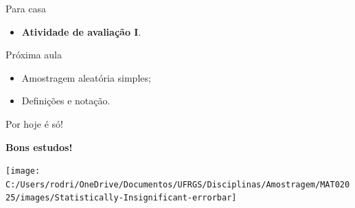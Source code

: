 \documentclass[
  10pt,
  ignorenonframetext,
]{beamer}
\providecommand{\tightlist}{%
  \setlength{\itemsep}{0pt}\setlength{\parskip}{0pt}}
\begin{document}
\begin{frame}{Para casa}
\protect\hypertarget{para-casa}{}
\begin{itemize}
\tightlist
\item
  \textbf{Atividade de avaliação I}.
\end{itemize}
\end{frame}

\begin{frame}{Próxima aula}
\protect\hypertarget{pruxf3xima-aula}{}
\begin{itemize}
\tightlist
\item
  Amostragem aleatória simples;
\item
  Definições e notação.
\end{itemize}
\end{frame}

\begin{frame}{Por hoje é só!}
\protect\hypertarget{por-hoje-uxe9-suxf3}{}
\begin{center}
{\bf Bons estudos!}
\end{center}

\begin{center}\texttt{[image: C:/Users/rodri/OneDrive/Documentos/UFRGS/Disciplinas/Amostragem/MAT02025/images/Statistically-Insignificant-errorbar]} \end{center}
\end{frame}
\end{document}
